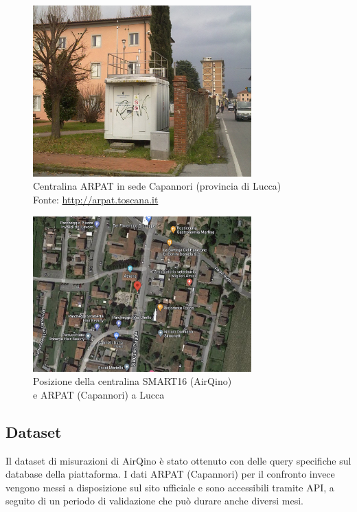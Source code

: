 \begin{figure}[H]
\centering
\captionsetup{justification=centering}
\includegraphics[width=0.75\textwidth,height=\textheight,keepaspectratio]{img/lu-capannori.jpg}
\caption{Centralina ARPAT in sede Capannori (provincia di Lucca)\\Fonte: \url{http://arpat.toscana.it}}
\label{fig:capannori}
\end{figure}

\begin{figure}[H]
\centering
\captionsetup{justification=centering}
\includegraphics[width=0.75\textwidth,height=\textheight,keepaspectratio]{img/capannori_gps.png}
\caption{Posizione della centralina SMART16 (AirQino)\\e ARPAT (Capannori) a Lucca}
\label{fig:capannori-gps}
\end{figure}

\subsection{Dataset }\label{ssec:dataset-no2}
Il dataset di misurazioni  di AirQino è stato ottenuto con delle query specifiche sul database della piattaforma.
I dati ARPAT (Capannori) per il confronto invece vengono messi a disposizione sul sito ufficiale \cite{arpat} e sono accessibili tramite API, a seguito di un periodo di validazione che può durare anche diversi mesi.

